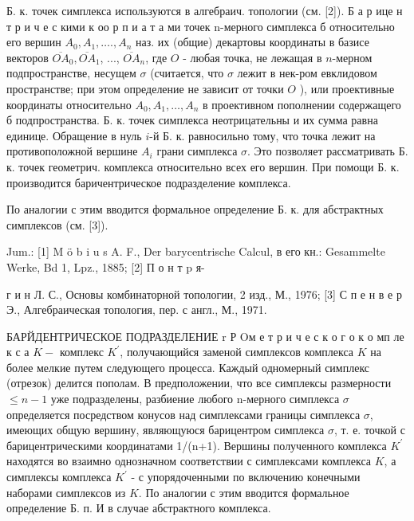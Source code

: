 \documentclass[10pt]{article}
\begin{document}
Б. к. точек симплекса используются в алгебраич. топологии (см. [2]). Б а р ице н т р и ч е с кими к оо р п и а т а ми точек n-мерного симплекса б относительно его вершин $A_{0}, A_{1}, \ldots ., A_{n}$ наз. их (общие) декартовы координаты в базисе векторов $\overline{O A}_{0}, \overline{O A}_{1}$, ..., $\overline{O A}_{n}$, где $O$ - любая точка, не лежащая в $n$-мерном подпространстве, несущем $\sigma$ (считается, что $\sigma$ лежит в нек-ром евклидовом пространстве; при этом определение не зависит от точки $O$ ), или проективные координаты относительно $A_{0}, A_{1}, \ldots, A_{n}$ в проективном пополнении содержащего б подпространства. Б. к. точек симплекса неотрицательны и их сумма равна единице. Обращение в нуль $i$-й Б. к. равносильно тому, что точка лежит на противоположной вершине $A_{i}$ грани симплекса $\sigma$. Это позволяет рассматривать Б. к. точек геометрич. комплекса относительно всех его вершин. При помощи Б. к. производится баричентрическое подразделение комплекса.



По аналогии с этим вводится формальное определение Б. к. для абстрактных симплексов (см. [3]).



Jum.: [1] M ö b i u s A. F., Der barycentrische Calcul, в его кн.: Gesammelte Werke, Bd 1, Lpz., 1885; [2] П о н т p я-

г и н Л. С., Основы комбинаторной топологии, 2 изд., М., 1976; [3] С п е н в е р Э., Алгебраическая топология, пер. с англ., М., 1971.



БАРЙДЕНТРИЧЕСКОЕ ПОДРАЗДЕЛЕНИЕ $\mathrm{r}$ Р Oм е т р и ч е с к о г о к о мп ле к с а $K-$ комплекс $K^{\prime}$, получающийся заменой симплексов комплекса $K$ на более мелкие путем следующего процесса. Каждый одномерный симплекс (отрезок) делится пополам. В предположении, что все симплексы размерности $\leqslant n-1$ уже подразделены, разбиение любого n-мерного симплекса $\sigma$ определяется посредством конусов над симплексами границы симплекса $\sigma$, имеющих общую вершину, являющуюся барицентром симплекса $\sigma$, т. е. точкой с барицентрическими координатами 1/(n+1). Вершины полученного комплекса $K^{\prime}$ находятся во взаимно однозначном соответствии с симплексами комплекса $K$, а симплексы комплекса $K^{\prime}$ - с упорядоченными по включению конечными наборами симплексов из $K$. По аналогии с этим вводится формальное определение Б. п. И в случае абстрактного комплекса.
\end{document}
